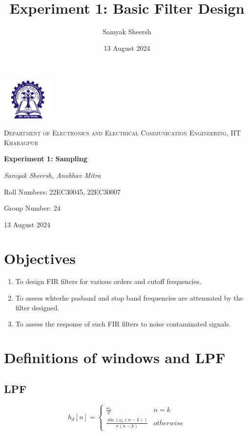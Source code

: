 \documentclass{article}
\title{Experiment 1: Basic Filter Design}
\author{Samyak Sheersh}
\date{13 August 2024}
\begin{document}
\begin{titlepage}
    \centering
    \includegraphics[width=0.2\textwidth]{KGP_logo.png}\par\vspace{1cm}
    {\scshape\LARGE Department of Electronics and Electrical Communication Engineering, IIT Kharagpur\par}
    \vspace{1cm}
    {\huge\bfseries Experiment 1: Sampling\par}
    \vspace{1.5cm}
    {\Large\itshape Samyak Sheersh, Anubhav Mitra\par}
    \vfill
    {\large Roll Numbers: 22EC30045, 22EC30007\par}
    {\large Group Number: 24\par}
    \vfill
    {\large 13 August 2024\par}
\end{titlepage}

\section{Objectives}
\begin{enumerate}
  \item To design FIR filters for various orders and cutoff frequencies.
  \item To assess whterhe pasband and stop band frequencies are attenuated by the filter designed.
  \item To assess the response of such FIR filters to noise contaminated signals. 
\end{enumerate}

\section{Definitions of windows and LPF}

\subsection{LPF}
\begin{equation}
  h_d[n] = \begin{cases} \frac{\omega_c}{\pi} & n=k  \\ \frac{\sin(\omega_c (n-k))}{\pi(n-k)} & otherwise \end{cases}
\end{equation}
\end{document}
